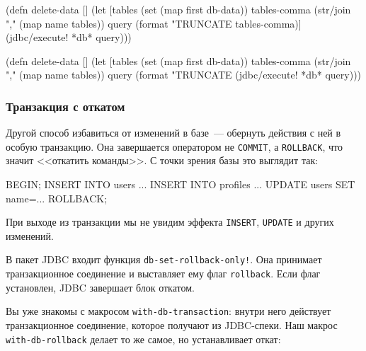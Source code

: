 \ifx\DEVICETYPE\MOBILE

\begin{english}
  \begin{clojure}
(defn delete-data []
  (let [tables (set (map first db-data))
        tables-comma
        (str/join "," (map name tables))
        query
        (format "TRUNCATE %
          tables-comma)]
    (jdbc/execute! *db* query)))
  \end{clojure}
\end{english}

\else

\begin{english}
  \begin{clojure}
(defn delete-data []
  (let [tables (set (map first db-data))
        tables-comma (str/join "," (map name tables))
        query (format "TRUNCATE %
    (jdbc/execute! *db* query)))
  \end{clojure}
\end{english}

\fi

\subsubsection*{Транзакция с откатом}



Другой способ избавиться от изменений в базе~--- обернуть действия с ней в
особую транзакцию. Она завершается оператором не \verb|COMMIT|, а
\verb|ROLLBACK|, что значит <<откатить команды>>. С точки зрения базы это
выглядит так:

\begin{english}
  \begin{sql}
BEGIN;
INSERT INTO users ...
INSERT INTO profiles ...
UPDATE users SET name=...
ROLLBACK;
  \end{sql}
\end{english}

При выходе из транзакции мы не увидим эффекта \verb|INSERT|, \verb|UPDATE| и
других изменений.

В пакет JDBC входит функция \texttt{db-set-roll\-back-only!}. Она принимает
транзакционное соединение и выставляет ему флаг \verb|rollback|. Если флаг
установлен, JDBC завершает блок откатом.


Вы уже знакомы с макросом \texttt{with-db-tran\-saction}: внутри него действует
транзакционное соединение, которое получают из JDBC-спеки. Наш макрос
\verb|with-db-rollback| делает то же самое, но устанавливает откат:

